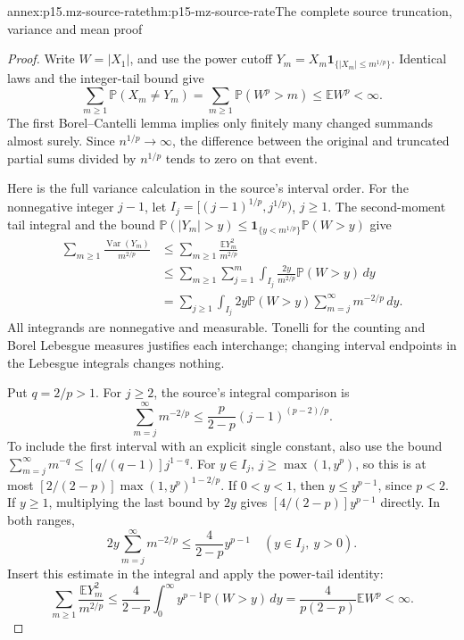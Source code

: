 \begin{annexitem}{annex:p15.mz-source-rate}{thm:p15-mz-source-rate}{The complete source truncation, variance and mean proof}
\begin{proof}
Write \(W=|X_1|\), and use the power cutoff
\(Y_m=X_m\mathbf1_{\{|X_m|\leq m^{1/p}\}}\).
Identical laws and the integer-tail bound give
\[
 \sum_{m\geq1}\mathbb P(X_m\ne Y_m)
   =\sum_{m\geq1}\mathbb P(W^p>m)
   \leq\mathbb EW^p<\infty.
\]
The first Borel--Cantelli lemma implies only finitely many changed
summands almost surely. Since \(n^{1/p}\to\infty\), the difference
between the original and truncated partial sums divided by \(n^{1/p}\)
tends to zero on that event.

Here is the full variance calculation in the source's interval order.
For the nonnegative integer \(j-1\), let
\(I_j=[(j-1)^{1/p},j^{1/p})\), \(j\geq1\).
The second-moment tail integral and the bound
\(\mathbb P(|Y_m|>y)\leq\mathbf1_{\{y<m^{1/p}\}}\mathbb P(W>y)\)
give
\[
 \begin{aligned}
 \sum_{m\geq1}\frac{\operatorname{Var}(Y_m)}{m^{2/p}}
 &\leq\sum_{m\geq1}\frac{\mathbb EY_m^2}{m^{2/p}}\\
 &\leq\sum_{m\geq1}\sum_{j=1}^m
       \int_{I_j}\frac{2y}{m^{2/p}}\mathbb P(W>y)\,dy\\
 &=\sum_{j\geq1}\int_{I_j}
       2y\mathbb P(W>y)\sum_{m=j}^\infty m^{-2/p}\,dy .
 \end{aligned}
\]
All integrands are nonnegative and measurable. Tonelli for the
counting and Borel Lebesgue measures justifies each interchange;
changing interval endpoints in the Lebesgue integrals changes nothing.

Put \(q=2/p>1\). For \(j\geq2\), the source's integral comparison is
\[
 \sum_{m=j}^\infty m^{-2/p}
   \leq\frac{p}{2-p}(j-1)^{(p-2)/p}.
\]
To include the first interval with an explicit single constant, also
use the bound
\(\sum_{m=j}^\infty m^{-q}\leq[q/(q-1)]j^{1-q}\).
For \(y\in I_j\), \(j\geq\max(1,y^p)\), so this is at most
\([2/(2-p)]\max(1,y^p)^{1-2/p}\).
If \(0<y<1\), then \(y\leq y^{p-1}\), since \(p<2\).
If \(y\geq1\), multiplying the last bound by \(2y\) gives
\([4/(2-p)]y^{p-1}\) directly. In both ranges,
\[
 2y\sum_{m=j}^\infty m^{-2/p}
                   \leq\frac4{2-p}y^{p-1}\quad(y\in I_j,\ y>0).
\]
Insert this estimate in the integral and apply the power-tail identity:
\[
 \sum_{m\geq1}\frac{\mathbb EY_m^2}{m^{2/p}}
   \leq\frac4{2-p}\int_0^\infty y^{p-1}\mathbb P(W>y)\,dy
   =\frac4{p(2-p)}\mathbb EW^p<\infty.
\]


\end{proof}
\end{annexitem}
